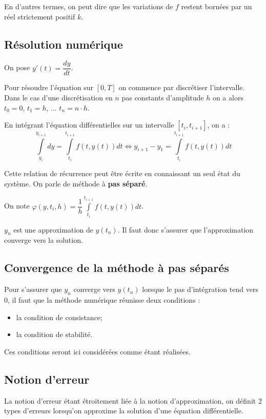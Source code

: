 \documentclass[10pt]{article}
\begin{document}
En d'autres termes, on peut dire que les variations de $f$ restent bornées par un réel strictement positif $k$.

\subsection{Résolution numérique}
On pose $y'(t)=\dfrac{dy}{dt}$.

Pour résoudre l'équation sur $[0,T]$ on commence par discrétiser l'intervalle. Dans le cas d'une discrétisation en $n$ pas constants d'amplitude $h$ on a alors $t_0 = 0$, $t_1=h$, ... $t_n=n\cdot h$.

En intégrant l'équation différentielles sur un intervalle $[t_i, t_{i+1}]$, on a : 
$$
\int\limits_{y_i}^{y_{i+1}} dy = \int\limits_{t_i}^{t_{i+1}} f(t,y(t)) dt 
\Longleftrightarrow 
y_{i+1} - y_1 = \int\limits_{t_i}^{t_{i+1}} f(t,y(t)) dt 
$$

Cette relation de récurrence peut être écrite en connaissant un seul état du système. On parle de méthode à \textbf{pas séparé}.

On note $\varphi (y,t_i,h)= \dfrac{1}{h} \int\limits_{t_i}^{t_{i+1}} f(t,y(t)) dt $.

$y_n$ est une approximation de $y(t_n)$. Il faut donc s'assurer que l'approximation converge vers la solution. 

\subsection{Convergence de la méthode à pas séparés}

Pour s'assurer que $y_n$ converge vers $y(t_n)$ lorsque le pas d'intégration tend vers 0, il faut que la méthode numérique réunisse deux conditions :
\begin{itemize}
\item la condition de consistance;
\item la condition de stabilité. 
\end{itemize}

Ces conditions seront ici considérées comme étant réalisées.

\subsection{Notion d'erreur}

La notion d'erreur étant étroitement liée à la notion d'approximation, on définit 2 types d'erreurs lorsqu'on approxime la solution d'une équation différentielle.
\end{document}
